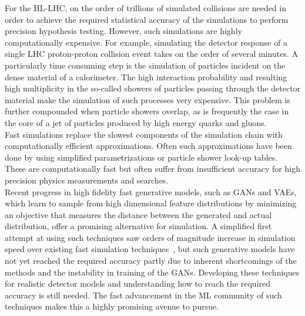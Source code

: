 

For the HL-LHC, on the order of trillions of simulated collisions are needed in order to achieve the required statistical accuracy of the simulations to perform precision hypothesis testing. However, such simulations are highly computationally expensive. For example, simulating the detector response of  a single LHC proton-proton collision event takes on the order of several minutes. A particularly time consuming step is the simulation of particles incident on the dense material of a calorimeter. %
The high interaction probability and resulting high multiplicity in the so-called showers of particles passing through the detector material make the simulation of such processes very expensive. This problem is further compounded when particle showers overlap, as is frequently the case in the core of a jet of particles produced by high energy quarks and gluons.\\


Fast simulations replace the slowest components of the simulation chain with computationally efficient approximations. Often such approximations have been done by using simplified parametrizations or particle shower look-up tables. These are computationally fast but often suffer from insufficient accuracy for high precision physics measurements and searches.\\

Recent progress in high fidelity fast generative models, such as GANs and VAEs, which learn to sample from high dimensional feature distributions by minimizing an objective that measures the distance between the generated and actual distribution, offer a promising alternative for simulation.
%
A simplified first attempt at using such techniques saw orders of magnitude increase in simulation speed over existing fast simulation techniques~\cite{Paganini:2017hrr}, but such generative models have not yet reached the required accuracy partly due to inherent shortcomings of the methods and the instability in training of the GANs.  Developing these techniques for realistic detector models and understanding how to reach the required accuracy is still needed. The fast advancement in the ML community of such techniques makes this a highly promising avenue to pursue.\\

